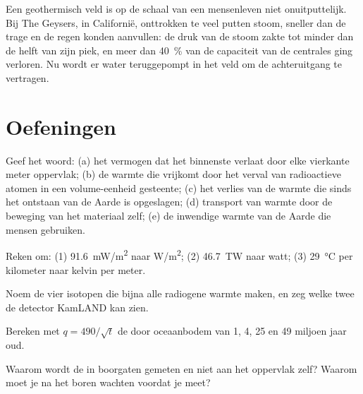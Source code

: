 Een geothermisch veld is op de schaal van een mensenleven niet onuitputtelijk. Bij The
Geysers, in Californië, onttrokken te veel putten stoom, sneller dan de
trage  en de regen konden aanvullen: de druk van de stoom zakte
tot minder dan de helft van zijn piek, en meer dan \qty{40}{\percent} van de
capaciteit van de centrales ging verloren. Nu wordt er water teruggepompt in het
veld om de achteruitgang te vertragen.

\section{Oefeningen}

\begin{exercise}[$\star$]\label{exo:g12:internal-heat:1}
Geef het woord: (a) het vermogen dat het binnenste verlaat door elke vierkante meter
oppervlak; (b) de warmte die vrijkomt door het verval van radioactieve atomen in een
volume-eenheid gesteente; (c) het verlies van de warmte die sinds het ontstaan van de Aarde is opgeslagen;
(d) transport van warmte door de beweging van het materiaal zelf; (e) de inwendige
warmte van de Aarde die mensen gebruiken.
\end{exercise}

\begin{exercise}[$\star$]\label{exo:g12:internal-heat:2}
Reken om: (1) \qty{91.6}{mW/m^2} naar \unit{W/m^2}; (2) \qty{46.7}{TW} naar
watt; (3) \qty{29}{\celsius} per kilometer naar kelvin per meter.
\end{exercise}

\begin{exercise}[$\star$]\label{exo:g12:internal-heat:3}
Noem de vier isotopen die bijna alle radiogene warmte maken, en zeg
welke twee de detector KamLAND kan zien.
\end{exercise}

\begin{exercise}[$\star$]\label{exo:g12:internal-heat:4}
Bereken met $q = 490/\sqrt{t}$ de  door oceaanbodem van 1, 4,
25 en 49 miljoen jaar oud.
\end{exercise}

\begin{exercise}[$\star$]\label{exo:g12:internal-heat:5}
Waarom wordt de  in boorgaten gemeten en niet aan het oppervlak zelf?
Waarom moet je na het boren wachten voordat je meet?
\end{exercise}

